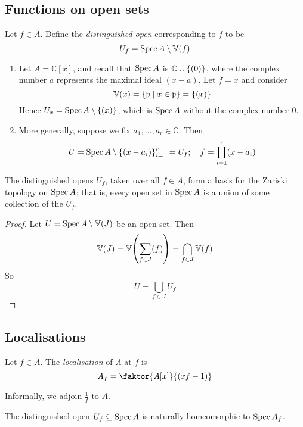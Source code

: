 \subsection{Functions on open sets}
\begin{definition}
    Let \( f \in A \).
    Define the \emph{distinguished open} corresponding to \( f \) to be
    \[ U_f = \operatorname{Spec} A \setminus \mathbb V(f) \]
\end{definition}
\begin{example}
    \begin{enumerate}
        \item Let \( A = \mathbb C[x] \), and recall that \( \operatorname{Spec} A \) is \( \mathbb C \cup \qty{(0)} \), where the complex number \( a \) represents the maximal ideal \( (x - a) \).
        Let \( f = x \) and consider
        \[ \mathbb V(x) = \qty{\mathfrak p \mid x \in \mathfrak p} = \qty{(x)} \]
        Hence \( U_x = \operatorname{Spec} A \setminus \qty{(x)} \), which is \( \operatorname{Spec} A \) without the complex number 0.
        \item More generally, suppose we fix \( a_1, \dots, a_r \in \mathbb C \).
        Then
        \[ U = \operatorname{Spec} A \setminus \qty{(x - a_i)}_{i=1}^r = U_f;\quad f = \prod_{i=1}^r (x-a_i) \]
    \end{enumerate}
\end{example}
\begin{lemma}
    The distinguished opens \( U_f \), taken over all \( f \in A \), form a basis for the Zariski topology on \( \operatorname{Spec} A \); that is, every open set in \( \operatorname{Spec} A \) is a union of some collection of the \( U_f \).
\end{lemma}
\begin{proof}
    Let \( U = \operatorname{Spec} A \setminus \mathbb V(J) \) be an open set.
    Then
    \[ \mathbb V(J) = \mathbb V\qty(\sum_{f \in J} (f)) = \bigcap_{f \in J} \mathbb V(f) \]
    So
    \[ U = \bigcup_{f \in J} U_f \]
\end{proof}

\subsection{Localisations}
\begin{definition}
    Let \( f \in A \).
    The \emph{localisation} of \( A \) at \( f \) is
    \[ A_f = \faktor{A[x]}{(xf - 1)} \]
\end{definition}
Informally, we adjoin \( \frac{1}{f} \) to \( A \).
\begin{lemma}
    The distinguished open \( U_f \subseteq \operatorname{Spec} A \) is naturally homeomorphic to \( \operatorname{Spec} A_f \).
\end{lemma}
